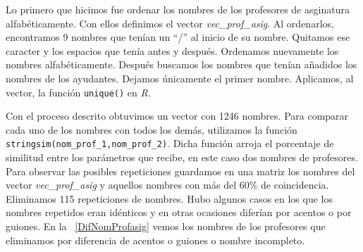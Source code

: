 Lo primero que hicimos fue ordenar los nombres de los profesores de asginatura alfabéticamente. Con ellos definimos el vector \textit{vec\_prof\_asig}. Al ordenarlos, encontramos 9 nombres que tenían un ``/'' al inicio de su nombre. Quitamos ese caracter y los espacios que tenía antes y después. Ordenamos nuevamente los nombres alfabéticamente. Después buscamos los nombres que tenían añadidos los nombres de los ayudantes. Dejamos únicamente el primer nombre. Aplicamos, al vector, la función \verb+unique()+ en \textit{R}.

Con el proceso descrito obtuvimos un vector con 1246 nombres. Para comparar cada uno de los nombres con todos los demás, utilizamos la función \verb+stringsim(nom_prof_1,nom_prof_2)+. Dicha función arroja el porcentaje de similitud entre los parámetros que recibe, en este caso dos nombres de profesores. Para observar las posibles repeticiones guardamos en una matriz los nombres del vector \textit{vec\_prof\_asig} y aquellos nombres con más del $60\%$ de coincidencia. Eliminamos 115 repeticiones de nombres. Hubo algunos casos en los que los nombres repetidos eran idénticos y en otras ocasiones diferían por acentos o por guiones. En la \tablename{~\ref{DifNomProfasig}} vemos los nombres de los profesores que eliminamos por diferencia de acentos o guiones o nombre incompleto.

